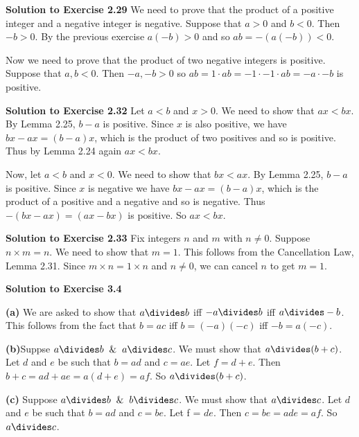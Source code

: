 \documentclass[oneside,12pt]{amsart}
\begin{document}
\bigskip


\textbf{Solution to Exercise 2.29} We need to prove that the product of a
positive integer and a  negative integer is negative. Suppose that $a>0$
and $b<0$. Then $-b>0$. By the previous exercise $a(-b) > 0$ and so
$ab = -(a(-b)) < 0$.

Now we need to prove that the product of two negative integers is positive.
Suppose that $a,b<0$. Then $-a,-b > 0$ so $ab = 1\cdot ab = -1\cdot-1\cdot ab
=-a\cdot-b$ is positive.

\bigskip


\textbf{Solution to Exercise 2.32} Let $a<b$ and $x>0$. We need to show
that $ax < bx$. By Lemma 2.25, $b-a$ is positive.
Since $x$ is also positive, we have $bx - ax = (b-a)x$,
which is the product of two positives and so is
positive. Thus by Lemma 2.24 again $ax < bx$.

Now, let $a<b$ and $x<0$. We need to show that $bx < ax$. By Lemma 2.25,
$b-a$ is positive. Since $x$ is negative we have $bx - ax = (b-a)x$, which
is the product of a positive and a negative and so is negative. Thus
$-(bx - ax) = (ax -bx)$ is positive. So $ax < bx$.

\bigskip


\textbf{Solution to Exercise 2.33} Fix integers $n$ and $m$ with $n\not=0$.
Suppose $n\times m=n$. We need to show that $m=1$. This follows from
the Cancellation Law, Lemma 2.31. Since $m\times n = 1 \times n$ and $n\not=0$,
we can cancel $n$ to get $m=1$.

\bigskip


\textbf{Solution to Exercise 3.4}

\textbf{(a)} We are asked to show that
$a\divides b$ iff $-a\divides b$ iff $a\divides -b$. This follows from the
fact that $b=ac$ iff $b = (-a)(-c)$ iff $-b = a(-c)$.

\bigskip

\textbf{(b)}Suppse  $a\divides b \And a\divides c$. We must show that
$a\divides (b+c)$. Let $d$ and $e$ be such that $b=ad$ and $c=ae$.
Let $f=d+e$.
Then $b+c = ad + ae = a(d+e) =af$. So $a\divides (b+c)$.

\bigskip

\textbf{(c)} Suppose $a\divides b \And b\divides c$. We must show that
$a\divides c$. Let $d$ and $e$ be such that
$b=ad$ and $c=be$. Let f = $de$. Then $c=be=ade = af$. So $a\divides c$.

\bigskip
\end{document}
